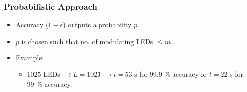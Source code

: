 \documentclass{beamer}
\begin{document}
	



	\begin{frame}\frametitle{Probabilistic Approach}


		\begin{itemize}
			\item Accuracy ($1 - \epsilon$) outputs a probability $p$.
			\item $p$ is chosen such that no. of modulating LEDs $\le m$.
			\item Example:
				\begin{itemize}
					\item $1025$ LEDs $\rightarrow L = 1023$ $\rightarrow t = 53$ s for 99.9 \% accuracy or $t = 22$ s for 99 \% accuracy.
				\end{itemize}
		\end{itemize}

		
	\end{frame}




\end{document}
